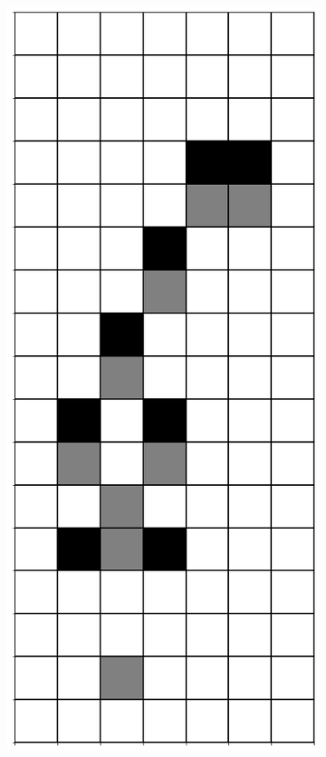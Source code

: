 \documentclass[12pt]{article}
\numberwithin{figure}{section} %
\begin{document}
\begin{figure}[H]
\begin{subfigure}{0.3\textwidth}
     \subcaption{}
   \end{subfigure}
     \begin{subfigure}{0.3\textwidth}
     \centering
     \includegraphics[angle=270,width=\linewidth]{Section4/14.1}

\end{subfigure}
\end{figure}
\end{document}

